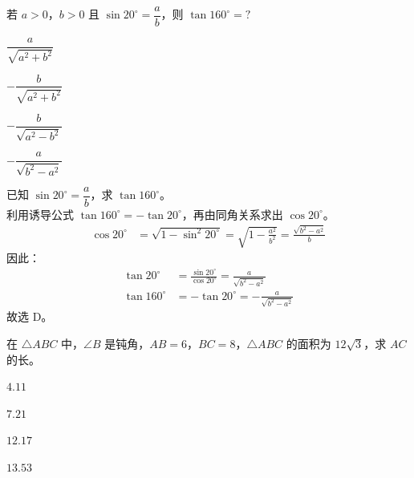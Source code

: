 \documentclass[12pt,a4paper]{exam-zh}
\begin{document}
\begin{question}
    若 $a>0$，$b>0$ 且 $\sin20^{\circ}=\dfrac{a}{b}$，则 $\tan160^{\circ}=?$\paren[D]
    \begin{choices}
        \item $\dfrac{a}{\sqrt{a^{2}+b^{2}}}$
        \item $-\dfrac{b}{\sqrt{a^{2}+b^{2}}}$
        \item $-\dfrac{b}{\sqrt{a^{2}-b^{2}}}$
        \item $-\dfrac{a}{\sqrt{b^{2}-a^{2}}}$
    \end{choices}
\end{question}

\begin{solution}
    已知 $\sin20^{\circ}=\dfrac{a}{b}$，求 $\tan160^{\circ}$。 \\
    利用诱导公式 $\tan160^{\circ}=-\tan20^{\circ}$，再由同角关系求出 $\cos20^{\circ}$。
    \begin{align*}
        \cos20^{\circ} &= \sqrt{1-\sin^{2}20^{\circ}} = \sqrt{1-\frac{a^{2}}{b^{2}}} = \frac{\sqrt{b^{2}-a^{2}}}{b}
    \end{align*}
    因此：
    \begin{align*}
        \tan20^{\circ} &= \frac{\sin20^{\circ}}{\cos20^{\circ}} = \frac{a}{\sqrt{b^{2}-a^{2}}} \\
        \tan160^{\circ} &= -\tan20^{\circ} = -\frac{a}{\sqrt{b^{2}-a^{2}}}
    \end{align*}
    故选 D。
\end{solution}

\begin{question}
    在 $\triangle ABC$ 中，$\angle B$ 是钝角，$AB=6$，$BC=8$，$\triangle ABC$ 的面积为 $12\sqrt{3}$，求 $AC$ 的长。\paren[C]
    \begin{choices}
        \item $4.11$
        \item $7.21$
        \item $12.17$
        \item $13.53$
    \end{choices}
\end{question}
\end{document}
